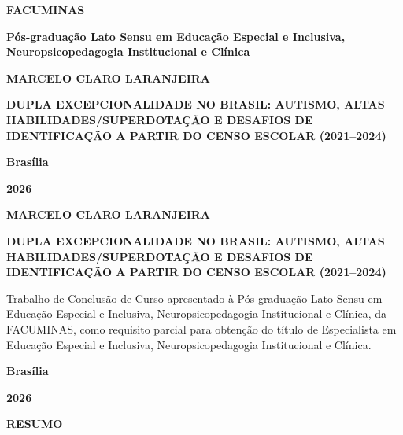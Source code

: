 \begin{titlepage}
\centering
{\bfseries FACUMINAS\par}
{\bfseries Pós-graduação Lato Sensu em Educação Especial e Inclusiva, Neuropsicopedagogia Institucional e Clínica\par}
\vspace{3.5cm}
{\bfseries MARCELO CLARO LARANJEIRA\par}
\vspace{3.5cm}
{\bfseries DUPLA EXCEPCIONALIDADE NO BRASIL: AUTISMO, ALTAS HABILIDADES/SUPERDOTAÇÃO E DESAFIOS DE IDENTIFICAÇÃO A PARTIR DO CENSO ESCOLAR (2021--2024)\par}
\vfill
{\bfseries Brasília\par}
{\bfseries 2026\par}
\end{titlepage}

\begin{titlepage}
\centering
{\bfseries MARCELO CLARO LARANJEIRA\par}
\vspace{3cm}
{\bfseries DUPLA EXCEPCIONALIDADE NO BRASIL: AUTISMO, ALTAS HABILIDADES/SUPERDOTAÇÃO E DESAFIOS DE IDENTIFICAÇÃO A PARTIR DO CENSO ESCOLAR (2021--2024)\par}
\vspace{2.5cm}
\begin{flushright}
\begin{minipage}{9cm}
\small
Trabalho de Conclusão de Curso apresentado à Pós-graduação Lato Sensu em Educação Especial e Inclusiva, Neuropsicopedagogia Institucional e Clínica, da \mbox{FACUMINAS}, como requisito parcial para obtenção do título de Especialista em Educação Especial e Inclusiva, \mbox{Neuropsicopedagogia} Institucional e Clínica.\par
\end{minipage}
\end{flushright}
\vfill
{\bfseries Brasília\par}
{\bfseries 2026\par}
\end{titlepage}

\begin{center}
\textbf{RESUMO}
\end{center}

